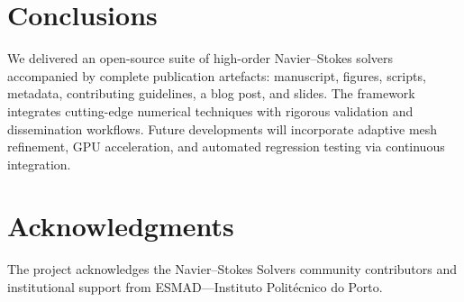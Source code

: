 \documentclass[final,onefignum,onetabnum]{siamonline220329}
\begin{document}
\section{Conclusions}
We delivered an open-source suite of high-order Navier--Stokes solvers accompanied by complete publication artefacts: manuscript, figures, scripts, metadata, contributing guidelines, a blog post, and slides.
The framework integrates cutting-edge numerical techniques with rigorous validation and dissemination workflows.
Future developments will incorporate adaptive mesh refinement, GPU acceleration, and automated regression testing via continuous integration.

\section*{Acknowledgments}
The project acknowledges the Navier--Stokes Solvers community contributors and institutional support from ESMAD---Instituto Polit\'ecnico do Porto.



\end{document}
